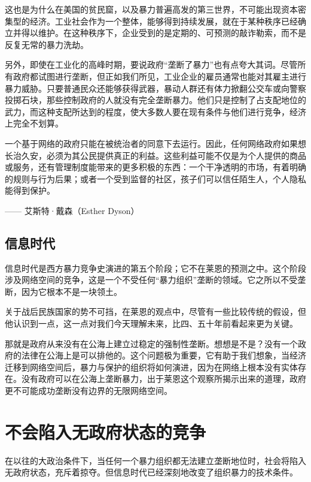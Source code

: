 这也是为什么在美国的贫民窟，以及暴力普遍高发的第三世界，不可能出现资本密集型的经济。工业社会作为一个整体，能够得到持续发展，就在于某种秩序已经确立并得以维护。在这种秩序下，企业受到的是定期的、可预测的敲诈勒索，而不是反复无常的暴力洗劫。

另外，即使在工业化的高峰时期，要说政府“垄断了暴力”也有点夸大其词。尽管所有政府都试图进行垄断，但正如我们所见，工业企业的雇员通常也能对其雇主进行暴力威胁。只要普通民众还能够获得武器，暴动人群还有体力掀翻公交车或向警察投掷石块，那些控制政府的人就没有完全垄断暴力。他们只是控制了占支配地位的武力，而这种支配所达到的程度，使大多数人要在现有条件与他们进行竞争，经济上完全不划算。

\begin{tcolorbox}
一个基于网络的政府只能在被统治者的同意下去运行。因此，任何网络政府如果想长治久安，必须为其公民提供真正的利益。这些利益可能不仅是为个人提供的商品或服务，还有管理制度能带来的更多积极的东西：一个干净透明的市场，有着明确的规则与行为后果；或者一个受到监督的社区，孩子们可以信任陌生人，个人隐私能得到保护。
\begin{flushright}
—— 艾斯特·戴森（Esther Dyson）
\end{flushright}
\end{tcolorbox}

\subsection{信息时代}
信息时代是西方暴力竞争史演进的第五个阶段；它不在莱恩的预测之中。这个阶段涉及网络空间的竞争，这是一个不受任何“暴力组织”垄断的领域。它之所以不受垄断，因为它根本不是一块领土。

关于战后民族国家的势不可挡，在莱恩的观点中，尽管有一些比较传统的假设，但他认识到一点，这一点对我们今天理解未来，比四、五十年前看起来更为关键。

那就是政府从来没有在公海上建立过稳定的强制性垄断。想想是不是？没有一个政府的法律在公海上是可以排他的。这个问题极为重要，它有助于我们想象，当经济迁移到网络空间后，暴力与保护的组织将如何演进，因为在网络上根本没有实体存在。没有政府可以在公海上垄断暴力，出于莱恩这个观察所揭示出来的道理，政府更不可能成功垄断没有边界的无限网络空间。

\section{不会陷入无政府状态的竞争}
在以往的大政治条件下，当任何一个暴力组织都无法建立垄断地位时，社会将陷入无政府状态，充斥着掠夺。但信息时代已经深刻地改变了组织暴力的技术条件。

